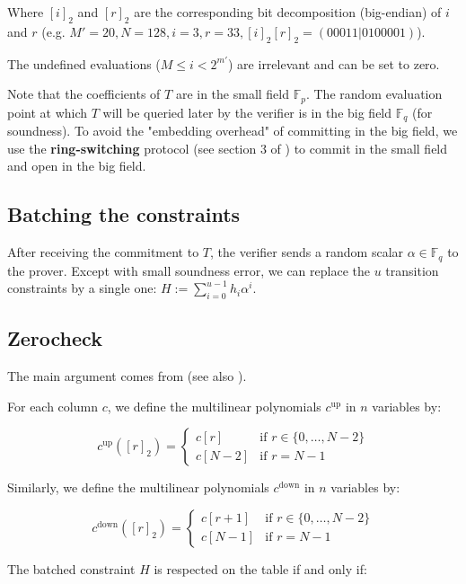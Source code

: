 \documentclass{article}
\newcommand{\Fp}{\mathbb F_p}
\newcommand{\Fq}{\mathbb F_q}
\newcommand{\Pol}{T}
\begin{document}
Where $[i]_2$ and $[r]_2$ are the corresponding bit decomposition (big-endian) of $i$ and $r$ (e.g. $M' = 20, N = 128, i = 3, r = 33, [i]_2[r]_2 = (00011 | 0100001)$).

The undefined evaluations ($M \leq i < 2^{m'}$) are irrelevant and can be set to zero.

Note that the coefficients of $\Pol$ are in the small field $\Fp$. The random evaluation point at which $\Pol$ will be queried later by the verifier is in the big field $\Fq$ (for soundness). To avoid the "embedding overhead" of committing in the big field, we use the \textbf{ring-switching} protocol (see section 3 of \cite{fri_binius}) to commit in the small field and open in the big field.

\subsection{Batching the constraints}

After receiving the commitment to $\Pol$, the verifier sends a random scalar $\alpha \in \Fq$ to the prover. Except with small soundness error, we can replace the $u$ transition constraints by a single one: $H := \sum_{i=0}^{u-1} h_i \alpha^i $.

\subsection{Zerocheck} \label{zerocheck}

The main argument comes from \cite{ccs} (see also \cite{simple_multivariate_AIR}).

For each column $c$, we define the multilinear polynomials $c^{\text{up}}$ in $n$ variables by:

$$c^{\text{up}}([r]_2)  = \begin{cases}
			c[r] & \text{if } r \in \{0, \dots, N-2\}\\
            c[N-2] & \text{if } r = N-1
		 \end{cases}$$

Similarly, we define the multilinear polynomials $c^{\text{down}}$ in $n$ variables by:

$$c^{\text{down}}([r]_2)  = \begin{cases}
			c[r+1] & \text{if } r \in \{0, \dots, N-2\}\\
            c[N-1] & \text{if } r = N-1
		 \end{cases}$$

The batched constraint $H$ is respected on the table if and only if:
\end{document}

